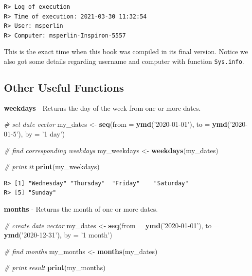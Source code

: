 \documentclass[
  12pt,
]{book}
\newenvironment{Shaded}{\begin{snugshade}}{\end{snugshade}}
\newcommand{\CommentTok}[1]{\textcolor[rgb]{0.37,0.37,0.37}{\textit{#1}}}
\newcommand{\DataTypeTok}[1]{\textcolor[rgb]{0.27,0.27,0.27}{#1}}
\newcommand{\KeywordTok}[1]{\textcolor[rgb]{0.27,0.27,0.27}{\textbf{#1}}}
\newcommand{\NormalTok}[1]{#1}
\newcommand{\StringTok}[1]{\textcolor[rgb]{0.5,0.5,0.5}{#1}}
\begin{document}
\begin{verbatim}
R> Log of execution
R> Time of execution: 2021-03-30 11:32:54
R> User: msperlin
R> Computer: msperlin-Inspiron-5557
\end{verbatim}

This is the exact time when this book was compiled in its final version. Notice we also got some details regarding username and computer with function \texttt{Sys.info}.

\hypertarget{other-useful-functions-5}{%
\subsection{Other Useful Functions}\label{other-useful-functions-5}}

\textbf{weekdays} - Returns the day of the week from one or more dates. 

\begin{Shaded}
\begin{Highlighting}[]
\CommentTok{# set date vector}
\NormalTok{my_dates <-}\StringTok{ }\KeywordTok{seq}\NormalTok{(}\DataTypeTok{from =} \KeywordTok{ymd}\NormalTok{(}\StringTok{'2020-01-01'}\NormalTok{),}
                \DataTypeTok{to =} \KeywordTok{ymd}\NormalTok{(}\StringTok{'2020-01-5'}\NormalTok{),}
                \DataTypeTok{by =} \StringTok{'1 day'}\NormalTok{)}

\CommentTok{# find corresponding weekdays}
\NormalTok{my_weekdays <-}\StringTok{ }\KeywordTok{weekdays}\NormalTok{(my_dates)}

\CommentTok{# print it}
\KeywordTok{print}\NormalTok{(my_weekdays)}
\end{Highlighting}
\end{Shaded}

\begin{verbatim}
R> [1] "Wednesday" "Thursday"  "Friday"    "Saturday" 
R> [5] "Sunday"
\end{verbatim}

\textbf{months} - Returns the month of one or more dates. 

\begin{Shaded}
\begin{Highlighting}[]
\CommentTok{# create date vector}
\NormalTok{my_dates <-}\StringTok{ }\KeywordTok{seq}\NormalTok{(}\DataTypeTok{from =} \KeywordTok{ymd}\NormalTok{(}\StringTok{'2020-01-01'}\NormalTok{),}
                \DataTypeTok{to =} \KeywordTok{ymd}\NormalTok{(}\StringTok{'2020-12-31'}\NormalTok{),}
                \DataTypeTok{by =} \StringTok{'1 month'}\NormalTok{)}

\CommentTok{# find months}
\NormalTok{my_months <-}\StringTok{ }\KeywordTok{months}\NormalTok{(my_dates)}

\CommentTok{# print result}
\KeywordTok{print}\NormalTok{(my_months)}
\end{Highlighting}
\end{Shaded}
\end{document}
